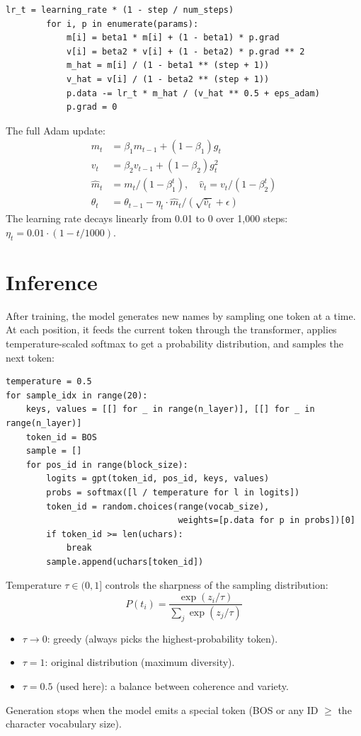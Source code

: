 \documentclass[11pt,a4paper]{article}
\begin{document}
\begin{lstlisting}[firstnumber=232]
        lr_t = learning_rate * (1 - step / num_steps)
        for i, p in enumerate(params):
            m[i] = beta1 * m[i] + (1 - beta1) * p.grad
            v[i] = beta2 * v[i] + (1 - beta2) * p.grad ** 2
            m_hat = m[i] / (1 - beta1 ** (step + 1))
            v_hat = v[i] / (1 - beta2 ** (step + 1))
            p.data -= lr_t * m_hat / (v_hat ** 0.5 + eps_adam)
            p.grad = 0
\end{lstlisting}

The full Adam update:
\begin{align}
m_t &= \beta_1 m_{t-1} + (1 - \beta_1) g_t \\
v_t &= \beta_2 v_{t-1} + (1 - \beta_2) g_t^2 \\
\hat{m}_t &= m_t / (1 - \beta_1^t), \quad \hat{v}_t = v_t / (1 - \beta_2^t) \\
\theta_t &= \theta_{t-1} - \eta_t \cdot \hat{m}_t / (\sqrt{\hat{v}_t} + \epsilon)
\end{align}
The learning rate decays linearly from 0.01 to 0 over 1{,}000 steps: $\eta_t = 0.01 \cdot (1 - t/1000)$.

\section{Inference}

After training, the model generates new names by sampling one token at a time. At each position, it feeds the current token through the transformer, applies temperature-scaled softmax to get a probability distribution, and samples the next token:

\begin{lstlisting}[firstnumber=261]
temperature = 0.5
for sample_idx in range(20):
    keys, values = [[] for _ in range(n_layer)], [[] for _ in range(n_layer)]
    token_id = BOS
    sample = []
    for pos_id in range(block_size):
        logits = gpt(token_id, pos_id, keys, values)
        probs = softmax([l / temperature for l in logits])
        token_id = random.choices(range(vocab_size),
                                  weights=[p.data for p in probs])[0]
        if token_id >= len(uchars):
            break
        sample.append(uchars[token_id])
\end{lstlisting}

Temperature $\tau \in (0, 1]$ controls the sharpness of the sampling distribution:
\[
P(t_i) = \frac{\exp(z_i / \tau)}{\sum_j \exp(z_j / \tau)}
\]
\begin{itemize}
  \item $\tau \to 0$: greedy (always picks the highest-probability token).
  \item $\tau = 1$: original distribution (maximum diversity).
  \item $\tau = 0.5$ (used here): a balance between coherence and variety.
\end{itemize}
Generation stops when the model emits a special token (BOS or any ID $\geq$ the character vocabulary size).
\end{document}
